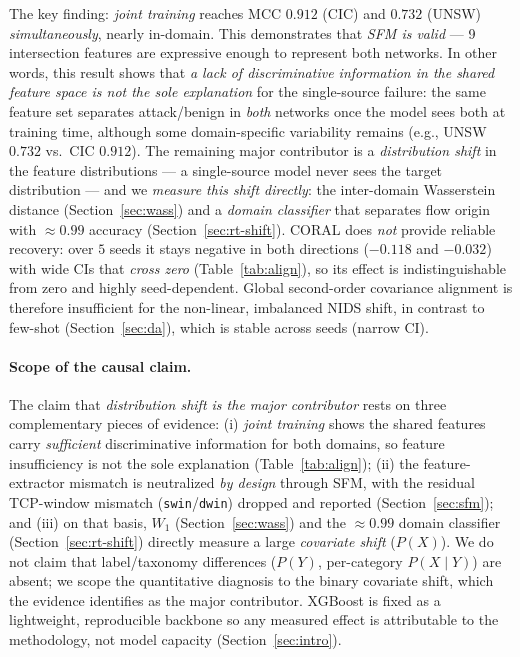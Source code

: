 \documentclass[preprint,12pt,authoryear]{elsarticle}
\begin{document}
The key finding: \emph{joint training} reaches MCC $0.912$ (CIC) and $0.732$
(UNSW) \emph{simultaneously}, nearly in-domain. This demonstrates that \emph{SFM is valid} --- 9 intersection features are expressive enough to represent both
networks. In
other words, this result shows that \emph{a lack of discriminative information in
the shared feature space is not the sole explanation} for the single-source
failure: the same feature set separates attack/benign in \emph{both} networks once
the model sees both at training time, although some domain-specific variability
remains (e.g., UNSW $0.732$ vs.\ CIC $0.912$). The remaining major contributor is a
\emph{distribution shift} in the feature distributions --- a single-source model
never sees the target distribution --- and we \emph{measure this shift directly}:
the inter-domain Wasserstein distance (Section~\ref{sec:wass}) and a
\emph{domain classifier} that separates flow origin with $\approx 0.99$ accuracy
(Section~\ref{sec:rt-shift}). CORAL does \emph{not} provide reliable recovery: over
$5$ seeds it stays negative in both directions ($-0.118$ and $-0.032$) with wide CIs
that \emph{cross zero} (Table~\ref{tab:align}), so its effect is indistinguishable
from zero and highly seed-dependent. Global second-order covariance alignment is
therefore insufficient for the non-linear, imbalanced NIDS shift, in contrast to
few-shot (Section~\ref{sec:da}), which is stable across seeds (narrow CI).

\paragraph{Scope of the causal claim.} The claim that \emph{distribution shift is
the major contributor} rests on three complementary pieces of evidence: (i)
\emph{joint training} shows the shared features carry \emph{sufficient}
discriminative information for both domains, so feature insufficiency is not the
sole explanation (Table~\ref{tab:align}); (ii) the feature-extractor mismatch is
neutralized \emph{by design} through SFM, with the residual TCP-window mismatch
(\texttt{swin}/\texttt{dwin}) dropped and reported (Section~\ref{sec:sfm}); and
(iii) on that basis, $W_1$ (Section~\ref{sec:wass}) and the $\approx 0.99$ domain
classifier (Section~\ref{sec:rt-shift}) directly measure a large \emph{covariate
shift} ($P(X)$). We do not claim that label/taxonomy differences ($P(Y)$, per-category
$P(X\mid Y)$) are absent; we scope the quantitative diagnosis to the binary covariate
shift, which the evidence identifies as the major contributor. XGBoost is fixed as a
lightweight, reproducible backbone so any measured
effect is attributable to the methodology, not model capacity
(Section~\ref{sec:intro}).
\end{document}
